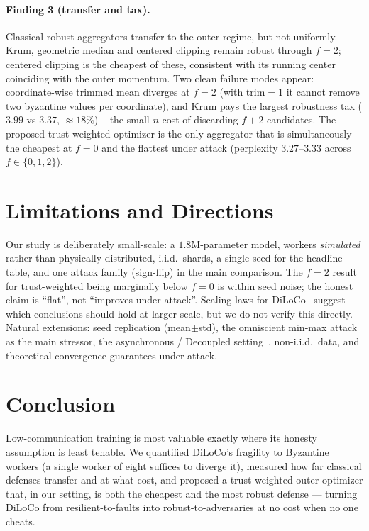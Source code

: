 \documentclass[11pt]{article}
\begin{document}
\paragraph{Finding 3 (transfer and tax).} Classical robust aggregators transfer to the outer
regime, but not uniformly. Krum, geometric median and centered clipping remain robust through
$f{=}2$; centered clipping is the cheapest of these, consistent with its running center
coinciding with the outer momentum. Two clean failure modes appear: coordinate-wise trimmed
mean diverges at $f{=}2$ (with $\text{trim}{=}1$ it cannot remove two byzantine values per
coordinate), and Krum pays the largest robustness tax ($3.99$ vs $3.37$, $\approx\!18\%$) --
the small-$n$ cost of discarding $f{+}2$ candidates. The proposed trust-weighted optimizer is
the only aggregator that is simultaneously the cheapest at $f{=}0$ and the flattest under
attack (perplexity $3.27$--$3.33$ across $f\in\{0,1,2\}$).

\section{Limitations and Directions}
\label{sec:limitations}
Our study is deliberately small-scale: a $1.8$M-parameter model, workers \emph{simulated}
rather than physically distributed, i.i.d.\ shards, a single seed for the headline table, and
one attack family (sign-flip) in the main comparison. The $f{=}2$ result for trust-weighted
being marginally below $f{=}0$ is within seed noise; the honest claim is ``flat'', not
``improves under attack''. Scaling laws for DiLoCo~\citep{dilocoscaling2025} suggest which
conclusions should hold at larger scale, but we do not verify this directly. Natural
extensions: seed replication (mean$\pm$std), the omniscient min-max attack~\citep{minmax2021}
as the main stressor, the asynchronous / Decoupled setting~\citep{decoupleddiloco2026},
non-i.i.d.\ data, and theoretical convergence guarantees under attack.

\section{Conclusion}
Low-communication training is most valuable exactly where its honesty assumption is least
tenable. We quantified DiLoCo's fragility to Byzantine workers (a single worker of eight
suffices to diverge it), measured how far classical defenses transfer and at what cost, and
proposed a trust-weighted outer optimizer that, in our setting, is both the cheapest and the
most robust defense --- turning DiLoCo from resilient-to-faults into robust-to-adversaries at
no cost when no one cheats.



\end{document}
